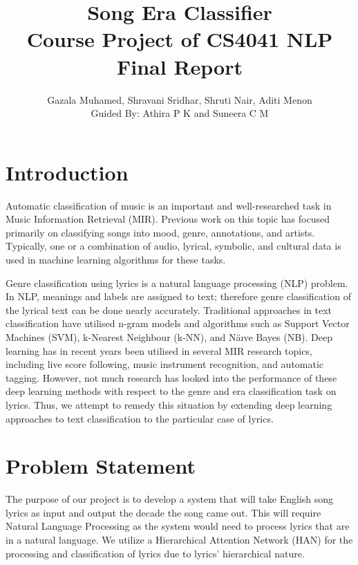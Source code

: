 \documentclass[a4paper,11pt,twocolumn]{article}
\title{Song Era Classifier \\ {\normalsize Course Project of CS4041 NLP \\Final Report}}
\author{Gazala Muhamed, Shravani Sridhar, Shruti Nair, Aditi Menon\\Guided By: Athira P K and Suneera C M}
\begin{document}
\maketitle
{}
\section{Introduction}
Automatic classification of music is an important and well-researched task in Music Information Retrieval (MIR). Previous work on this topic has focused primarily on classifying songs into mood, genre, annotations, and artists. Typically, one or a combination of audio, lyrical, symbolic, and cultural data is used in machine learning algorithms for these tasks.

Genre classification using lyrics is a natural language processing (NLP) problem. In NLP, meanings and labels are assigned to text; therefore genre classification of the lyrical text can be done nearly accurately. Traditional approaches in text classification have utilised n-gram models and algorithms such as Support Vector Machines (SVM), k-Nearest Neighbour (k-NN), and Näıve Bayes (NB). Deep learning has in recent years been utilised in several MIR research topics, including live score following, music instrument recognition, and automatic tagging. However, not much research has looked into the performance of these deep learning methods with respect to the genre and era classification task on lyrics. Thus, we attempt to remedy this situation by extending deep learning approaches to text classification to the particular case of lyrics.
\section{Problem Statement}
The purpose of our project is to develop a system that will take English song lyrics as input and output the decade the song came out. This will require Natural Language Processing as the system would need to process lyrics that are in a natural language. We utilize a Hierarchical Attention Network (HAN) for the processing and classification of lyrics due to lyrics' hierarchical nature.
\end{document}
